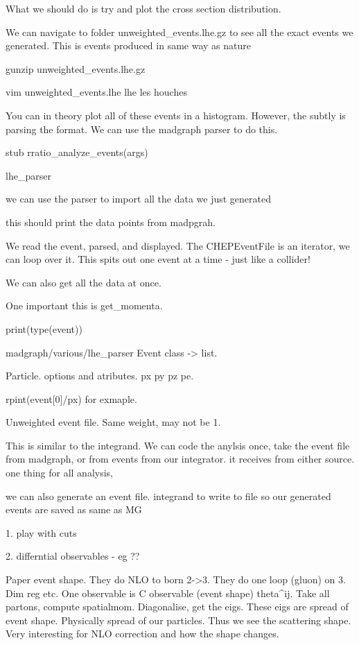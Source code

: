    What we should do is try and plot the cross section distribution.

   We can navigate to folder  unweighted_events.lhe.gz to see all the exact events we generated. This is events produced in same way as nature

    gunzip  unweighted_events.lhe.gz

   vim unweighted_events.lhe
 lhe les houches
 
   You can in theory plot all of these events in a histogram. However, the subtly is parsing the format. We can use the madgraph parser to do this.



   stub   rratio_analyze_events(args)

   lhe_parser

   we can use the parser to import all the data we just generated

   this should print the data points from madpgrah.

   We read the event, parsed, and displayed. The CHEPEventFile is an iterator, we can loop over it. This spits out one event at a time - just like a collider!

   We can also get all the data at once.

   One important this is get_momenta.

   print(type(event))


   madgraph/various/lhe_parser
   Event class -> list. 

   Particle. options and atributes. px py pz pe. 

   rpint(event[0]/px) for exmaple.

   Unweighted event file. Same weight, may not be 1.

   This is similar to the integrand. We can code the anylsis once, take the event file from madgraph, or from events from our integrator. it receives from either source. one thing for all analysis, 

   we can also generate an event file. integrand to write to file so our generated events are saved as same as MG

   1. play with cuts

   2. differntial observables - eg ??

   Paper event shape. They do NLO to born 2->3. They do one loop (gluon) on 3. Dim reg etc. 
   One observable is C observable (event shape) theta^ij. Take all partons, compute spatialmom. Diagonalise, get the eigs. These eigs are spread of event shape. Physically spread of our particles. Thus we see the scattering shape. Very interesting for NLO correction and how the shape changes.

   